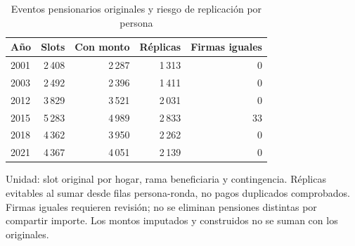 \begin{table}[!htbp]
\centering
\caption{Eventos pensionarios originales y riesgo de replicación por persona}\label{tab:titularidad-duplicacion}
\small\setlength{\tabcolsep}{4pt}
\renewcommand{\arraystretch}{1.15}
\begin{tabular}{lrrrr}
\toprule
\textbf{Año} & \textbf{Slots} & \textbf{Con monto} & \textbf{Réplicas} & \textbf{Firmas iguales} \\
\midrule
2001 & 2\,408 & 2\,287 & 1\,313 & 0 \\
2003 & 2\,492 & 2\,396 & 1\,411 & 0 \\
2012 & 3\,829 & 3\,521 & 2\,031 & 0 \\
2015 & 5\,283 & 4\,989 & 2\,833 & 33 \\
2018 & 4\,362 & 3\,950 & 2\,262 & 0 \\
2021 & 4\,367 & 4\,051 & 2\,139 & 0 \\
\bottomrule
\end{tabular}
\par\medskip
\parbox{\linewidth}{\footnotesize Unidad: slot original por hogar, rama beneficiaria y contingencia. Réplicas evitables al sumar desde filas persona-ronda, no pagos duplicados comprobados. Firmas iguales requieren revisión; no se eliminan pensiones distintas por compartir importe. Los montos imputados y construidos no se suman con los originales.}
\end{table}
